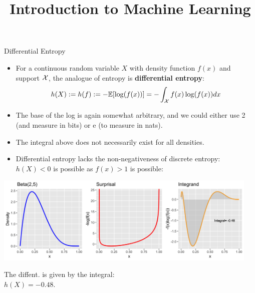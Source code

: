 \documentclass[11pt,compress,t,notes=noshow, xcolor=table]{beamer}
\title{Introduction to Machine Learning}
\begin{document}
    

\begin{vbframe}{Differential Entropy} 
  \begin{itemize}
    \item For a continuous random variable $X$ with density function $f(x)$ and support $\mathcal{X}$, the analogue of entropy is \textbf{differential entropy}:
    \small{
    $$ h(X) := h(f) := - \mathbb{E}[\log(f(x))]= - \int_{\mathcal{X}} f(x) \log(f(x)) dx $$}
    \item The base of the log is again somewhat arbitrary, and we could either use 2 (and measure in bits) or e (to measure in nats).
    \item The integral above does not necessarily exist for all densities.
    \item Differential entropy lacks the non-negativeness of discrete entropy: $h(X) < 0$ is possible as $f(x) > 1$ is possible:
    \end{itemize}
\begin{minipage}{0.8\textwidth}
    \begin{center}
    \includegraphics[width = 0.95\textwidth]{figure/beta_entropy.png}
    \end{center}
\end{minipage}%
\begin{minipage}{0.2\textwidth}
  \scriptsize{The diffent. is given by the integral:\\ $h(X)=-0.48$.}
\end{minipage}
\end{vbframe}
\end{document}

